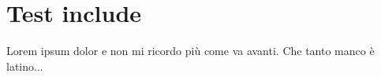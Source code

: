 \chapter{Test include}
\label{test}

Lorem ipsum dolor e non mi ricordo più come va avanti. Che tanto manco è latino...

